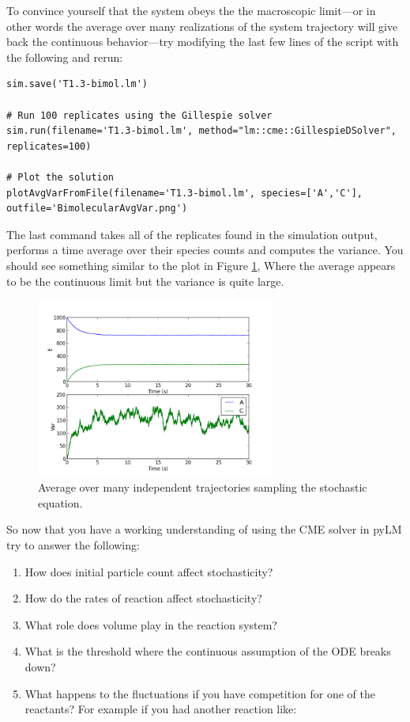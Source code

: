 To convince yourself that the system obeys the the macroscopic limit---or in other words the average over many realizations of the system trajectory will give back the continuous behavior---try modifying the last few lines of the script with the following and rerun: 

\begin{lstlisting}[style=customPy, backgroundcolor=\color{mygray}, label=lst:bimolLM]
sim.save('T1.3-bimol.lm')

# Run 100 replicates using the Gillespie solver
sim.run(filename='T1.3-bimol.lm', method="lm::cme::GillespieDSolver", replicates=100)

# Plot the solution
plotAvgVarFromFile(filename='T1.3-bimol.lm', species=['A','C'], outfile='BimolecularAvgVar.png')
\end{lstlisting}

The last command takes all of the replicates found in the simulation output, performs a time average over their species counts and computes the variance. You should see something similar to the plot in Figure \ref{fig:bimolRep}, Where the average appears to be the continuous limit but the variance is quite large. \\

\begin{figure}[h!]
  \centering
        \includegraphics[width=0.7\textwidth]{Figures/BimolecularAvgVar.png}
        \caption{Average over many independent trajectories sampling the stochastic equation.} \label{fig:bimolRep}
\end{figure}

So now that you have a working understanding of using the CME solver in pyLM try to answer the following:
\begin{enumerate}
\item How does initial particle count affect stochasticity?
\item How do the rates of reaction affect stochasticity?
\item What role does volume play in the reaction system?
\item What is the threshold where the continuous assumption of the ODE breaks down?
\item What happens to the fluctuations if you have competition for one of the reactants?  For example if you had another reaction like: 
\end{enumerate}


